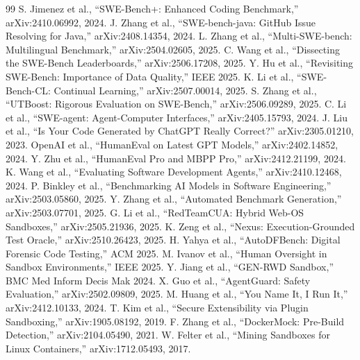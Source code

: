 \documentclass[12pt,a4paper]{report}
\begin{document}
\begin{thebibliography}{99}
 S. Jimenez et al., ``SWE-Bench+: Enhanced Coding Benchmark,'' arXiv:2410.06992, 2024.
 J. Zhang et al., ``SWE-bench-java: GitHub Issue Resolving for Java,'' arXiv:2408.14354, 2024.
 L. Zhang et al., ``Multi-SWE-bench: Multilingual Benchmark,'' arXiv:2504.02605, 2025.
 C. Wang et al., ``Dissecting the SWE-Bench Leaderboards,'' arXiv:2506.17208, 2025.
 Y. Hu et al., ``Revisiting SWE-Bench: Importance of Data Quality,'' IEEE 2025.
 K. Li et al., ``SWE-Bench-CL: Continual Learning,'' arXiv:2507.00014, 2025.
 S. Zhang et al., ``UTBoost: Rigorous Evaluation on SWE-Bench,'' arXiv:2506.09289, 2025.
 C. Li et al., ``SWE-agent: Agent-Computer Interfaces,'' arXiv:2405.15793, 2024.
 J. Liu et al., ``Is Your Code Generated by ChatGPT Really Correct?'' arXiv:2305.01210, 2023.
 OpenAI et al., ``HumanEval on Latest GPT Models,'' arXiv:2402.14852, 2024.
 Y. Zhu et al., ``HumanEval Pro and MBPP Pro,'' arXiv:2412.21199, 2024.
 K. Wang et al., ``Evaluating Software Development Agents,'' arXiv:2410.12468, 2024.
 P. Binkley et al., ``Benchmarking AI Models in Software Engineering,'' arXiv:2503.05860, 2025.
 Y. Zhang et al., ``Automated Benchmark Generation,'' arXiv:2503.07701, 2025.
 G. Li et al., ``RedTeamCUA: Hybrid Web-OS Sandboxes,'' arXiv:2505.21936, 2025.
 K. Zeng et al., ``Nexus: Execution-Grounded Test Oracle,'' arXiv:2510.26423, 2025.
 H. Yahya et al., ``AutoDFBench: Digital Forensic Code Testing,'' ACM 2025.
 M. Ivanov et al., ``Human Oversight in Sandbox Environments,'' IEEE 2025.
 Y. Jiang et al., ``GEN-RWD Sandbox,'' BMC Med Inform Decis Mak 2024.
 X. Guo et al., ``AgentGuard: Safety Evaluation,'' arXiv:2502.09809, 2025.
 M. Huang et al., ``You Name It, I Run It,'' arXiv:2412.10133, 2024.
 T. Kim et al., ``Secure Extensibility via Plugin Sandboxing,'' arXiv:1905.08192, 2019.
 F. Zhang et al., ``DockerMock: Pre-Build Detection,'' arXiv:2104.05490, 2021.
 W. Felter et al., ``Mining Sandboxes for Linux Containers,'' arXiv:1712.05493, 2017.

\end{thebibliography}
\end{document}
